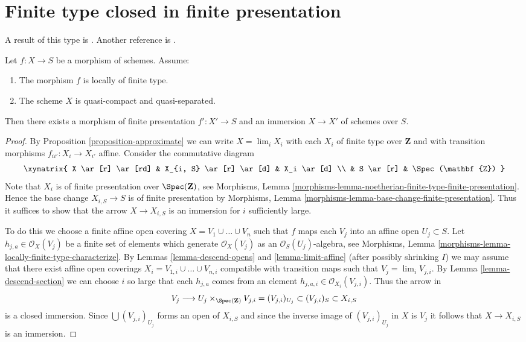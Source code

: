 \section{Finite type closed in finite presentation}
\label{section-finite-type-closed-in-finite-presentation}

\noindent
A result of this type is \cite[Satz 2.10]{Kiehl}. Another
reference is \cite{Conrad-Nagata}.

\begin{lemma}
\label{lemma-locally-finite-type-in-finite-presentation}
Let $f : X \to S$ be a morphism of schemes.
Assume:
\begin{enumerate}
\item The morphism $f$ is locally of finite type.
\item The scheme $X$ is quasi-compact and quasi-separated.
\end{enumerate}
Then there exists a morphism of finite presentation
$f' : X' \to S$ and an immersion $X \to X'$ of schemes over $S$.
\end{lemma}

\begin{proof}
By
Proposition \ref{proposition-approximate}
we can write
$X = \lim_i X_i$ with each $X_i$ of finite type over $\mathbf{Z}$ and
with transition morphisms $f_{ii'} : X_i \to X_{i'}$ affine.
Consider the commutative diagram
$$
\xymatrix{
X \ar[r] \ar[rd] & X_{i, S} \ar[r] \ar[d] & X_i \ar[d] \\
& S \ar[r] & \Spec(\mathbf{Z})
}
$$
Note that $X_i$ is of finite presentation over $\Spec(\mathbf{Z})$, see
Morphisms,
Lemma \ref{morphisms-lemma-noetherian-finite-type-finite-presentation}.
Hence the base change $X_{i, S} \to S$ is of finite presentation by
Morphisms, Lemma \ref{morphisms-lemma-base-change-finite-presentation}.
Thus it suffices to show that the arrow $X \to X_{i, S}$ is an
immersion for $i$ sufficiently large.

\medskip\noindent
To do this we choose a finite affine open covering
$X = V_1 \cup \ldots \cup V_n$ such that
$f$ maps each $V_j$ into an affine open $U_j \subset S$.
Let $h_{j, a} \in \mathcal{O}_X(V_j)$ be a finite
set of elements which generate $\mathcal{O}_X(V_j)$ as
an $\mathcal{O}_S(U_j)$-algebra, see
Morphisms, Lemma \ref{morphisms-lemma-locally-finite-type-characterize}.
By Lemmas \ref{lemma-descend-opens} and \ref{lemma-limit-affine}
(after possibly shrinking $I$) we may assume that
there exist affine open coverings
$X_i = V_{1, i} \cup \ldots \cup V_{n, i}$
compatible with transition maps such that $V_j = \lim_i V_{j, i}$.
By Lemma \ref{lemma-descend-section} we can choose $i$ so large that each
$h_{j, a}$ comes from an element
$h_{j, a, i} \in \mathcal{O}_{X_i}(V_{j, i})$.
Thus the arrow in
$$
V_j \longrightarrow U_j \times_{\Spec(\mathbf{Z})} V_{j, i} =
(V_{j, i})_{U_j} \subset (V_{j, i})_S \subset X_{i, S}
$$
is a closed immersion. Since $\bigcup (V_{j, i})_{U_j}$ forms an open of
$X_{i, S}$ and since the inverse image of $(V_{j, i})_{U_j}$ in $X$
is $V_j$ it follows that $X \to X_{i, S}$ is an immersion.
\end{proof}

